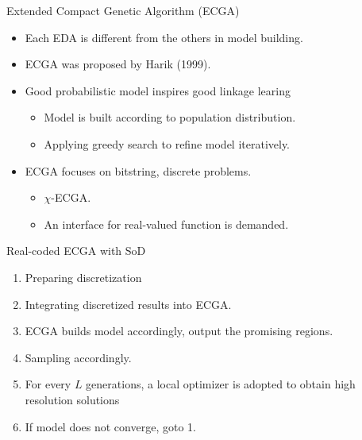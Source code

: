 \begin{frame}{Extended Compact Genetic Algorithm (ECGA)}
  \begin{itemize}
    \item Each EDA is different from the others in \alert{model
      building}.
      \vspace*{14pt}
    \item ECGA was proposed by Harik (1999).
      \vspace*{14pt}
    \item Good probabilistic model inspires good linkage learing
      \begin{itemize}
        \item Model is built according to population distribution.
        \item Applying greedy search to refine model iteratively.
      \end{itemize}
      \vspace*{14pt}
    \item ECGA focuses on bitstring, discrete problems.
      \begin{itemize}
        \item $\chi$-ECGA.
        \item An interface for real-valued function is demanded.
      \end{itemize}
  \end{itemize}
\end{frame}
\begin{frame}{Real-coded ECGA with SoD}
  \pause
  \begin{enumerate}
    \item Preparing discretization\pause
      \vspace*{14pt}
    \item Integrating discretized results into ECGA.\pause
      \vspace*{14pt}
    \item ECGA builds model accordingly, output the promising
      regions.\pause
      \vspace*{14pt}
    \item Sampling accordingly.\pause
      \vspace*{14pt}
    \item For every $L$ generations, a local optimizer is adopted to
      obtain high resolution solutions\pause
      \vspace*{14pt}
    \item If model does not converge, goto 1.
  \end{enumerate}
\end{frame}

